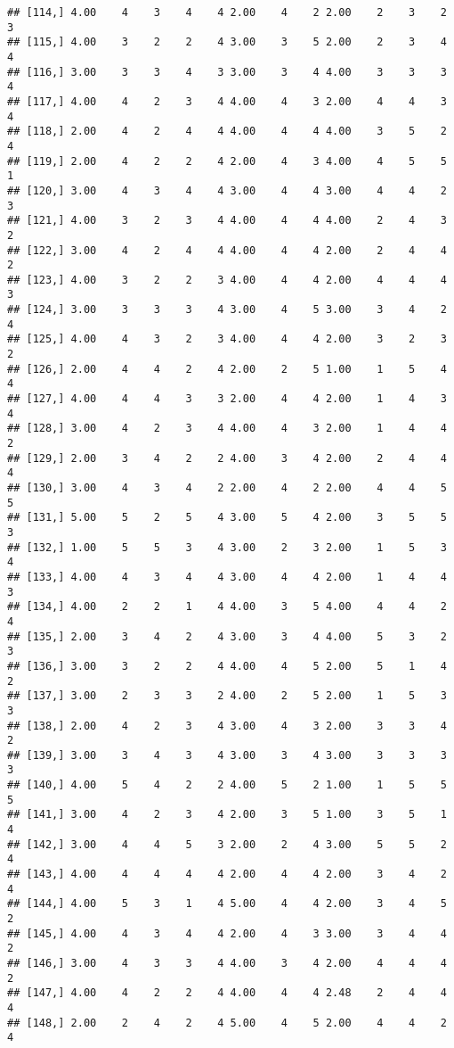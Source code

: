 \documentclass[]{article}
\begin{document}
\begin{verbatim}
## [114,] 4.00    4    3    4    4 2.00    4    2 2.00    2    3    2    3
## [115,] 4.00    3    2    2    4 3.00    3    5 2.00    2    3    4    4
## [116,] 3.00    3    3    4    3 3.00    3    4 4.00    3    3    3    4
## [117,] 4.00    4    2    3    4 4.00    4    3 2.00    4    4    3    4
## [118,] 2.00    4    2    4    4 4.00    4    4 4.00    3    5    2    4
## [119,] 2.00    4    2    2    4 2.00    4    3 4.00    4    5    5    1
## [120,] 3.00    4    3    4    4 3.00    4    4 3.00    4    4    2    3
## [121,] 4.00    3    2    3    4 4.00    4    4 4.00    2    4    3    2
## [122,] 3.00    4    2    4    4 4.00    4    4 2.00    2    4    4    2
## [123,] 4.00    3    2    2    3 4.00    4    4 2.00    4    4    4    3
## [124,] 3.00    3    3    3    4 3.00    4    5 3.00    3    4    2    4
## [125,] 4.00    4    3    2    3 4.00    4    4 2.00    3    2    3    2
## [126,] 2.00    4    4    2    4 2.00    2    5 1.00    1    5    4    4
## [127,] 4.00    4    4    3    3 2.00    4    4 2.00    1    4    3    4
## [128,] 3.00    4    2    3    4 4.00    4    3 2.00    1    4    4    2
## [129,] 2.00    3    4    2    2 4.00    3    4 2.00    2    4    4    4
## [130,] 3.00    4    3    4    2 2.00    4    2 2.00    4    4    5    5
## [131,] 5.00    5    2    5    4 3.00    5    4 2.00    3    5    5    3
## [132,] 1.00    5    5    3    4 3.00    2    3 2.00    1    5    3    4
## [133,] 4.00    4    3    4    4 3.00    4    4 2.00    1    4    4    3
## [134,] 4.00    2    2    1    4 4.00    3    5 4.00    4    4    2    4
## [135,] 2.00    3    4    2    4 3.00    3    4 4.00    5    3    2    3
## [136,] 3.00    3    2    2    4 4.00    4    5 2.00    5    1    4    2
## [137,] 3.00    2    3    3    2 4.00    2    5 2.00    1    5    3    3
## [138,] 2.00    4    2    3    4 3.00    4    3 2.00    3    3    4    2
## [139,] 3.00    3    4    3    4 3.00    3    4 3.00    3    3    3    3
## [140,] 4.00    5    4    2    2 4.00    5    2 1.00    1    5    5    5
## [141,] 3.00    4    2    3    4 2.00    3    5 1.00    3    5    1    4
## [142,] 3.00    4    4    5    3 2.00    2    4 3.00    5    5    2    4
## [143,] 4.00    4    4    4    4 2.00    4    4 2.00    3    4    2    4
## [144,] 4.00    5    3    1    4 5.00    4    4 2.00    3    4    5    2
## [145,] 4.00    4    3    4    4 2.00    4    3 3.00    3    4    4    2
## [146,] 3.00    4    3    3    4 4.00    3    4 2.00    4    4    4    2
## [147,] 4.00    4    2    2    4 4.00    4    4 2.48    2    4    4    4
## [148,] 2.00    2    4    2    4 5.00    4    5 2.00    4    4    2    4

\end{verbatim}
\end{document}
